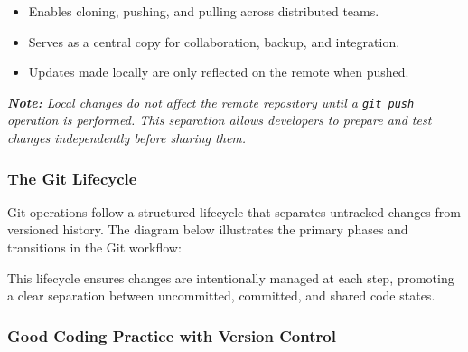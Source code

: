 \documentclass{article}
\newcommand{\codecmd}[1]{\textcolor[rgb]{0,0.5,0}{\texttt{#1}}}
\begin{document}
\begin{itemize}
    \item Enables cloning, pushing, and pulling across distributed teams.
    \item Serves as a central copy for collaboration, backup, and integration.
    \item Updates made locally are only reflected on the remote when pushed.
\end{itemize}

\noindent\textit{\textbf{Note:} Local changes do not affect the remote repository until a \codecmd{git push} operation is performed. This separation allows developers to prepare and test changes independently before sharing them.}

\subsubsection{The Git Lifecycle}

Git operations follow a structured lifecycle that separates untracked changes from versioned history. The diagram below illustrates the primary phases and transitions in the Git workflow:

\begin{center}
\end{center}

This lifecycle ensures changes are intentionally managed at each step, promoting a clear separation between uncommitted, committed, and shared code states.

\subsubsection{Good Coding Practice with Version Control}
\end{document}

